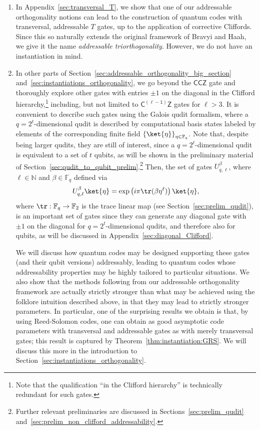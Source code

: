\documentclass[11pt]{article}
\theoremstyle{definition}
\newcommand{\CCZ}{\mathsf{CCZ}}
\newcommand{\CLZ}{\mathsf{C^{(\ell-1)}Z}}
\begin{document}
    \begin{enumerate}
        \item In Appendix~\ref{sec:transversal_T}, we show that one of our addressable orthogonality notions can lead to the construction of quantum codes with transversal, addressable $T$ gates, up to the application of corrective Cliffords. Since this so naturally extends the original framework of Bravyi and Haah, we give it the name \textit{addressable triorthogonality}. However, we do not have an instantiation in mind. %

        \item In other parts of Section~\ref{sec:addressable_orthogonality_big_section} and~\ref{sec:instantiations_orthogonality}, we go beyond the $\CCZ$ gate and thoroughly explore other gates with entries $\pm 1$ on the diagonal in the Clifford hierarchy,\footnote{Note that the qualification ``in the Clifford hierarchy'' is technically redundant for such gates.} including, but not limited to $\CLZ$ gates for $\ell > 3$. 
        It is convenient to describe such gates using the Galois qudit formalism, where a $q=2^t$-dimensional qudit is described by computational basis states labeled by elements of the corresponding finite field $\left\{\ket{\eta}\right\}_{\eta \in \mathbb{F}_q}$. Note that, despite being larger qudits, they are still of interest, since a $q=2^t$-dimensional qudit is equivalent to a set of $t$ qubits, as will be shown in the preliminary material of Section~\ref{sec:qudit_to_qubit_prelim}.\footnote{Further relevant preliminaries are discussed in Sections~\ref{sec:prelim_qudit} and~\ref{sec:prelim_non_clifford_addressability}.} Then, the set of gates $U_{q,\ell}^\beta$, where $\ell \in \mathbb{N}$ and $\beta \in \mathbb{F}_q$ defined via
    \begin{equation}
        U_{q,\ell}^\beta\ket{\eta} = \exp\left(i\pi\tr(\beta\eta^\ell)\right)\ket{\eta},
    \end{equation}
    where $\tr:\mathbb{F}_q \to \mathbb{F}_2$ is the trace linear map (see Section~\ref{sec:prelim_qudit}), is an important set of gates since they can generate any diagonal gate with $\pm 1$ on the diagonal for $q=2^t$-dimensional qudits, and therefore also for qubits, as will be discussed in Appendix~\ref{sec:diagonal_Clifford}. 
    
    We will discuss how quantum codes may be designed supporting these gates (and their qubit versions) addressably, leading to quantum codes whose addressability properties may be highly tailored to particular situations.  
    We also show that the methods following from our addressable orthogonality framework are actually strictly stronger than what may be achieved using the folklore intuition described above, in that they may lead to strictly stronger parameters.
    In particular, one of the surprising results we obtain is that, by using Reed-Solomon codes, one can obtain as good asymptotic code parameters with transversal and addressable gates as with merely transversal gates; this result is captured by Theorem~\ref{thm:instantiation:GRS}.
    We will discuss this more in the introduction to Section~\ref{sec:instantiations_orthogonality}.
    \end{enumerate} 
    
\end{document}
